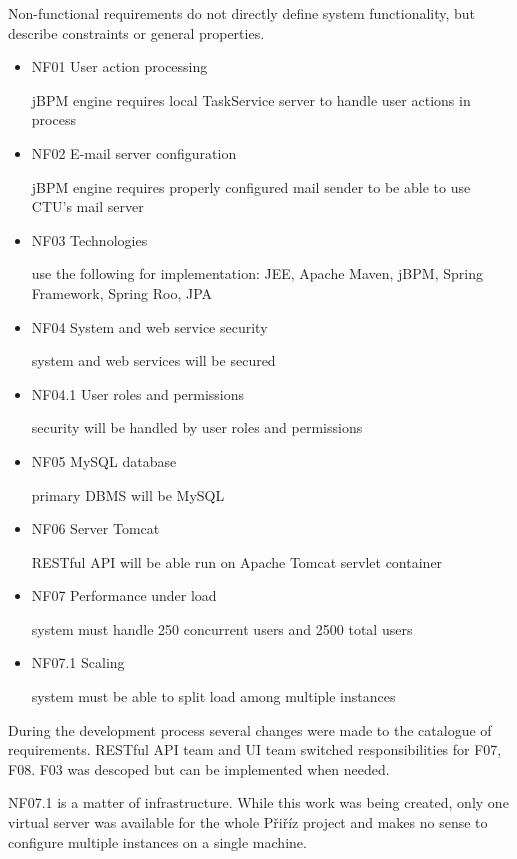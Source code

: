 	Non-functional requirements do not directly define system functionality, but describe constraints or general
	properties.
	
	\begin{itemize}
		\item NF01 User action processing
	
		jBPM engine requires local TaskService server to handle user actions in process
		
		\item NF02 E-mail server configuration

		jBPM engine requires properly configured mail sender to be able to use CTU's mail server
		
		\item NF03 Technologies
		
		use the following for implementation: JEE, Apache Maven, jBPM, Spring Framework, Spring Roo, JPA
		
		\item NF04 System and web service security
		
		system and web services will be secured
		
		\item NF04.1 User roles and permissions
		
		security will be handled by user roles and permissions
		
		\item NF05 MySQL database
		
		primary DBMS will be MySQL
		
		\item NF06 Server Tomcat
		
		RESTful API will be able run on Apache Tomcat servlet container
		
		\item NF07 Performance under load
		
		system must handle 250 concurrent users and 2500 total users
		
		\item NF07.1 Scaling
		
		system must be able to split load among multiple instances
	\end{itemize}
	
	During the development process several changes were made to the catalogue of requirements. RESTful API team and UI team
	switched responsibilities for  F07, F08. F03 was descoped but can be implemented when needed.
	
	NF07.1 is a matter of infrastructure. While this work was being created, only one virtual server was available for the
	whole Přiříz project and makes no sense to configure multiple instances on a single machine.
